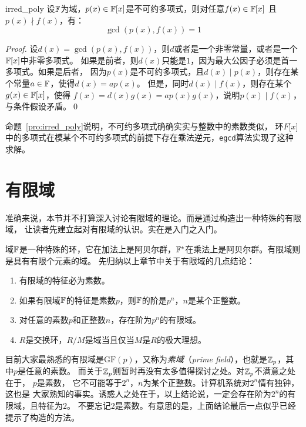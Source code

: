 \begin{proposition}{}{irred_poly}
设${\mathbb F}$为域，$p(x)\in {\mathbb F}\lbrack x \rbrack$是不可约多项式，则对任意$f(x) \in {\mathbb F}\lbrack x \rbrack$
且$p(x)\nmid f(x)$，有：
\[\gcd(p(x), f(x))=1\]
\end{proposition}
\begin{proof}
设$d(x) = \gcd(p(x), f(x))$，则$d$或者是一个非零常量，或者是一个${\mathbb F}\lbrack x \rbrack$中非零多项式。
如果是前者，则$d(x)$只能是$1$，因为最大公因子必须是首一多项式。如果是后者，
因为$p(x)$是不可约多项式，且$d(x) \mid p(x)$，则存在某个常量$a \in {\mathbb F}$，使得$d(x) = a p(x)$。
但是，同时$d(x) \mid f(x)$，则存在某个$g(x) \in {\mathbb F}\lbrack x \rbrack$，使得
$f(x) = d(x)g(x) = a p(x) g(x)$，说明$p(x) \mid f(x)$，与条件假设矛盾。\qed
\end{proof}
命题~\ref{pro:irred_poly}说明，不可约多项式确确实实与整数中的素数类似，
环$F\lbrack x \rbrack$中的多项式在模某个不可约多项式的前提下存在乘法逆元，\texttt{egcd}算法实现了这种求解。

\section{有限域}
\label{sec:gf}
准确来说，本节并不打算深入讨论有限域的理论。而是通过构造出一种特殊的有限域，
让读者先建立起对有限域的认识。实在是入门之入门。

域${\mathbb F}$是一种特殊的环，它在加法上是阿贝尔群，${\mathbb F}^*$在乘法上是阿贝尔群。有限域则是具有有限个元素的域。
先归纳以上章节中关于有限域的几点结论：
\begin{enumerate}
\item 有限域的特征必为素数。

\item 如果有限域${\mathbb F}$的特征是素数$p$，则${\mathbb F}$的阶是$p^n$，$n$是某个正整数。

\item 对任意的素数$p$和正整数$n$，存在阶为$p^n$的有限域。

\item $R$是交换环，$R/M$是域当且仅当$M$是$R$的极大理想。
\end{enumerate}

目前大家最熟悉的有限域是$\mathrm{GF}(p)$，又称为\emph{素域}（\emph{prime field}），也就是${\mathbb Z}_p$，其中$p$是任意的素数。
而关于${\mathbb Z}_p$则暂时再没有太多值得探讨之处。对${\mathbb Z}_p$不满意之处在于，
$p$是素数， 它不可能等于$2^n$，$n$为某个正整数。计算机系统对$2^n$情有独钟，这也是
大家熟知的事实。诱惑人之处在于，以上结论说，一定会存在阶为$2^n$的有限域，且特征为$2$。
不要忘记$2$是素数。有意思的是，上面结论最后一点似乎已经提示了构造的方法。

